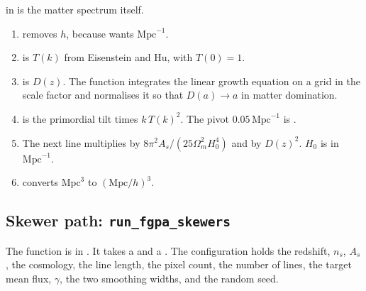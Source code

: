 \documentclass[11pt]{article}
\begin{document}
 in  is the matter spectrum itself.

\begin{enumerate}
\item {} removes \(h\), because  wants \(\mathrm{Mpc}^{-1}\).
\item {} is \(T(k)\) from Eisenstein and Hu, with \(T(0)=1\).
\item {} is \(D(z)\). The function  integrates the linear growth equation on a grid in the scale factor and normalises it so that \(D(a)\to a\) in matter domination.
\item {} is the primordial tilt times \(k\,T(k)^2\). The pivot \(0.05\,\mathrm{Mpc}^{-1}\) is .
\item The next line multiplies by \(8\pi^2 A_s/(25\Omega_m^2 H_0^4)\) and by \(D(z)^2\). \(H_0\) is  in \(\mathrm{Mpc}^{-1}\).
\item {} converts \(\mathrm{Mpc}^3\) to \((\mathrm{Mpc}/h)^3\).
\end{enumerate}

\subsection{Skewer path: \texttt{run\_fgpa\_skewers}}

The function is in . It takes a  and a . The configuration holds the redshift, \(n_s\), \(A_s\), the cosmology, the line length, the pixel count, the number of lines, the target mean flux, \(\gamma\), the two smoothing widths, and the random seed.
\end{document}
